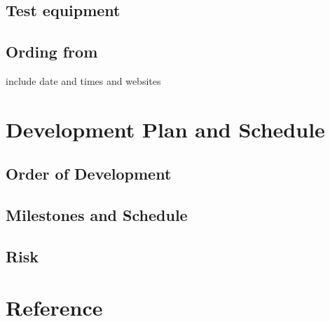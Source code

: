 \documentclass[11pt]{article}
\begin{document}
\subsection{Test equipment}
\subsection{Ording from}
include date and times and websites

\section{Development Plan and Schedule}
\subsection{Order of Development}
\subsection{Milestones and Schedule}
\subsection{Risk}

\section{Reference}
\end{document}
